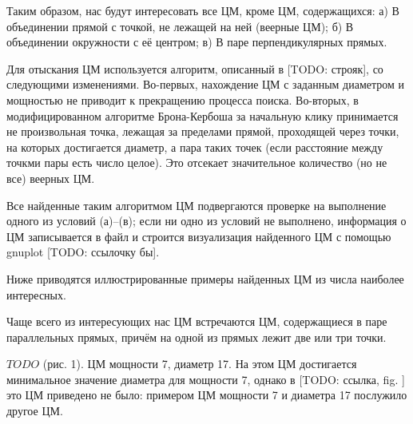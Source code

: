 \documentclass[draft, 12pt]{article}
\begin{document}
Таким образом, нас будут интересовать все ЦМ, кроме ЦМ, содержащихся:
а) В объединении прямой с точкой, не лежащей на ней (веерные ЦМ);
б) В объединении окружности с её центром;
в) В паре перпендикулярных прямых.

Для отыскания ЦМ используется алгоритм, описанный в [TODO: строяк],
со следующими изменениями.
Во-первых, нахождение ЦМ с заданным диаметром и мощностью не приводит к прекращению процесса поиска.
Во-вторых, в модифицированном алгоритме Брона-Кербоша за начальную клику
принимается не произвольная точка, лежащая за пределами прямой, проходящей через точки,
на которых достигается диаметр, а пара таких точек (если расстояние между точкми пары есть число целое).
Это отсекает значительное количество (но не все) веерных ЦМ.

Все найденные таким алгоритмом ЦМ подвергаются проверке на выполнение одного из условий (а)--(в);
если ни одно из условий не выполнено, информация о ЦМ записывается в файл и строится визуализация найденного ЦМ с помощью gnuplot
[TODO: ссылочку бы].

Ниже приводятся иллюстрированные примеры найденных ЦМ из числа наиболее интересных.

Чаще всего из интересующих нас ЦМ встречаются ЦМ, содержащиеся в паре параллельных прямых,
причём на одной из прямых лежит две или три точки.


$ TODO $ (рис. 1).
ЦМ мощности 7, диаметр 17.
На этом ЦМ достигается минимальное значение диаметра для мощности 7,
однако в [TODO: ссылка, fig. ] это ЦМ приведено не было:
примером ЦМ мощности 7 и диаметра 17 послужило другое ЦМ.





\end{document}
